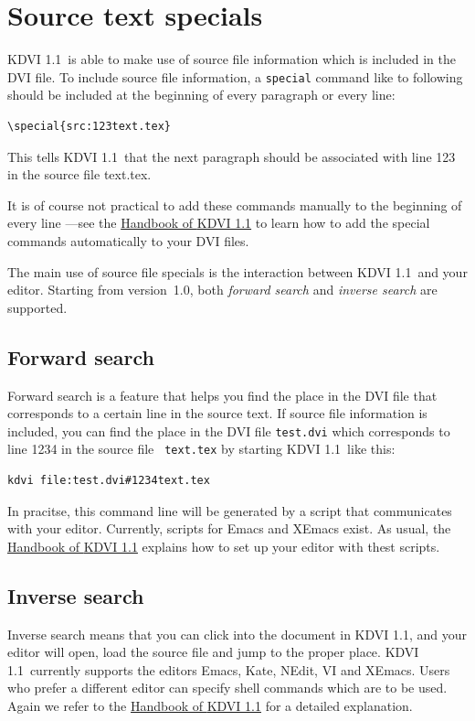 \documentclass{article}
\newcommand{\KDVI}{{\sf KDVI 1.1}}
\begin{document}
\section{Source text specials}

\KDVI\ is able to make use of source file information which is included
in the DVI file. To include source file information, a {\tt special}
command like to following should be included at the beginning of every
paragraph or every line:
\begin{verbatim}
\special{src:123text.tex}
\end{verbatim}
This tells \KDVI\ that the next paragraph should be associated with
line 123 in the source file text.tex.

It is of course not practical to add these commands manually to the
beginning of every line ---see the \href{help:/kdvi}{Handbook of
\KDVI} to learn how to add the special commands automatically to your
DVI files.

The main use of source file specials is the interaction between \KDVI\
and your editor. Starting from version~1.0, both \emph{forward search}
and \emph{inverse search} are supported.

\subsection{Forward search}

Forward search is a feature that helps you find the place in the DVI
file that corresponds to a certain line in the source text. If source
file information is included, you can find the place in the DVI file
{\tt test.dvi} which corresponds to line 1234 in the source file {\tt
text.tex} by starting \KDVI\ like this:
\begin{verbatim}
kdvi file:test.dvi#1234text.tex
\end{verbatim}
In pracitse, this command line will be generated by a script that
communicates with your editor. Currently, scripts for Emacs and XEmacs
exist. As usual, the \href{help:/kdvi/forward-search.html}{Handbook of
\KDVI} explains how to set up your editor with thest scripts.


\subsection{Inverse search}

Inverse search means that you can click into the document in \KDVI,
and your editor will open, load the source file and jump to the proper
place. \KDVI\ currently supports the editors Emacs, Kate, NEdit, VI
and XEmacs. Users who prefer a different editor can specify shell
commands which are to be used. Again we refer to the
\href{help:/kdvi/inverse-search.html}{Handbook of \KDVI} for a detailed explanation.
\end{document}
